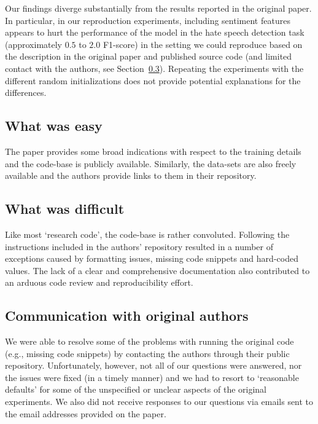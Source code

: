Our findings diverge substantially from the results reported in the original paper. In particular, in our reproduction experiments, including sentiment features appears to hurt the performance of the model in the hate speech detection task (approximately $0.5$ to $2.0$ F1-score)
in the setting we could reproduce
based on the description in the original paper and published source code
(and limited contact with the authors, see Section~\ref{sec:contact}).
Repeating the experiments with the different random initializations
does not provide potential explanations for the differences.


\subsection{What was easy}

The paper provides some broad indications with respect to the training details and the code-base is publicly available. Similarly, the data-sets are also freely available and the authors provide links to them in their repository.

\subsection{What was difficult}

Like most `research code', the code-base is rather convoluted. Following the instructions included in the authors' repository resulted in a number of exceptions caused by formatting issues, missing code snippets and hard-coded values. The lack of a clear and comprehensive documentation also contributed to an arduous code review and reproducibility effort.


\subsection{Communication with original authors}\label{sec:contact}

We were able to resolve some of the problems with running the original code
(e.g., missing code snippets)
by contacting the authors through their public repository.
Unfortunately, however, not all of our questions were answered,
nor the issues were fixed (in a timely manner) and 
we had to resort to `reasonable defaults' for some of the 
unspecified or unclear aspects of the original experiments.
We also did not receive responses to our questions via emails
sent to the email addresses provided on the paper.

